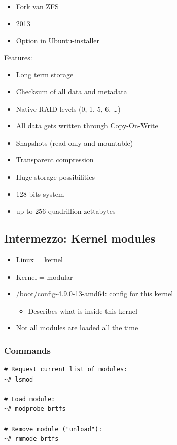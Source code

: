 \documentclass{article}
\begin{document}
\begin{itemize}
    \item Fork van ZFS
    \item 2013
    \item Option in Ubuntu-installer
\end{itemize}

Features:

\begin{itemize}
    \item Long term storage
    \item Checksum of all data and metadata
    \item Native RAID levels (0, 1, 5, 6, \dots)
    \item All data gets written through Copy-On-Write
    \item Snapshots (read-only and mountable)
    \item Transparent compression
    \item Huge storage possibilities
    \item 128 bits system
    \item up to 256 quadrillion zettabytes
\end{itemize}

\subsection{Intermezzo: Kernel modules}

\begin{itemize}
    \item Linux = kernel
    \item Kernel = modular
    \item /boot/config-4.9.0-13-amd64: config for this kernel
    \begin{itemize}
        \item Describes what is inside this kernel
    \end{itemize}
    \item Not all modules are loaded all the time
\end{itemize}

\subsubsection{Commands}

\begin{verbatim}
# Request current list of modules:
~# lsmod

# Load module:
~# modprobe brtfs

# Remove module ("unload"):
~# rmmode brtfs

\end{verbatim}
\end{document}
